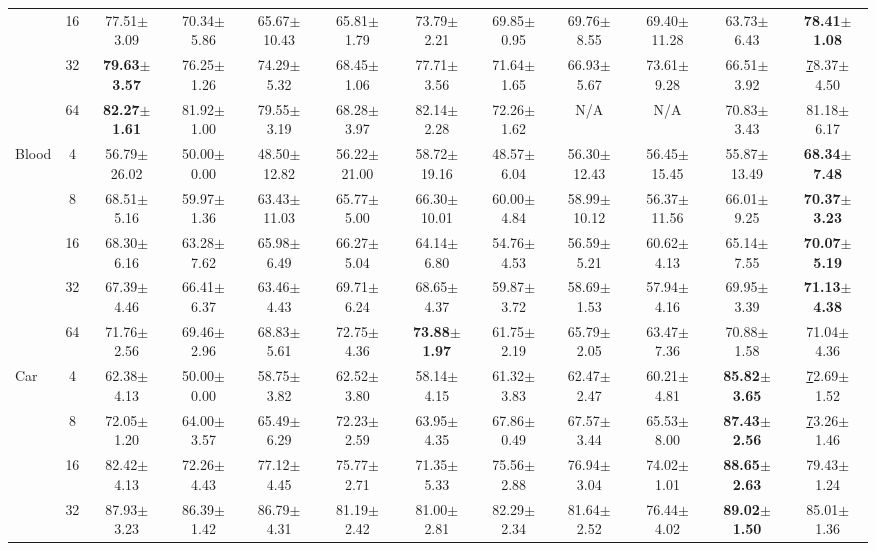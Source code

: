 \documentclass{article}
\theoremstyle{plain}
\theoremstyle{definition}
\theoremstyle{remark}
\begin{document}
\begin{table}[h!]
{\begin{tabular}{@{}lccccccccccc@{}}
 & 16 & 77.51$\pm$3.09 & 70.34$\pm$5.86 & 65.67$\pm$10.43 & 65.81$\pm$1.79 & 73.79$\pm$2.21 & 69.85$\pm$0.95 & 69.76$\pm$8.55 & 69.40$\pm$11.28 & 63.73$\pm$6.43 & \textbf{78.41$\pm$1.08} \\
 & 32 & \textbf{79.63$\pm$3.57} & 76.25$\pm$1.26 & 74.29$\pm$5.32 & 68.45$\pm$1.06 & 77.71$\pm$3.56 & 71.64$\pm$1.65 & 66.93$\pm$5.67 & 73.61$\pm$9.28 & 66.51$\pm$3.92 & {\ul 78.37$\pm$4.50} \\
 & 64 & \textbf{82.27$\pm$1.61} & 81.92$\pm$1.00 & 79.55$\pm$3.19 & 68.28$\pm$3.97 & 82.14$\pm$2.28 & 72.26$\pm$1.62 & N/A & N/A & 70.83$\pm$3.43 & 81.18$\pm$6.17 \\ \hline
Blood & 4 & 56.79$\pm$26.02 & 50.00$\pm$0.00 & 48.50$\pm$12.82 & 56.22$\pm$21.00 & 58.72$\pm$19.16 & 48.57$\pm$6.04 & 56.30$\pm$12.43 & 56.45$\pm$15.45 & 55.87$\pm$13.49 & \textbf{68.34$\pm$7.48} \\
 & 8 & 68.51$\pm$5.16 & 59.97$\pm$1.36 & 63.43$\pm$11.03 & 65.77$\pm$5.00 & 66.30$\pm$10.01 & 60.00$\pm$4.84 & 58.99$\pm$10.12 & 56.37$\pm$11.56 & 66.01$\pm$9.25 & \textbf{70.37$\pm$3.23} \\
 & 16 & 68.30$\pm$6.16 & 63.28$\pm$7.62 & 65.98$\pm$6.49 & 66.27$\pm$5.04 & 64.14$\pm$6.80 & 54.76$\pm$4.53 & 56.59$\pm$5.21 & 60.62$\pm$4.13 & 65.14$\pm$7.55 & \textbf{70.07$\pm$5.19} \\
 & 32 & 67.39$\pm$4.46 & 66.41$\pm$6.37 & 63.46$\pm$4.43 & 69.71$\pm$6.24 & 68.65$\pm$4.37 & 59.87$\pm$3.72 & 58.69$\pm$1.53 & 57.94$\pm$4.16 & 69.95$\pm$3.39 & \textbf{71.13$\pm$4.38} \\
 & 64 & 71.76$\pm$2.56 & 69.46$\pm$2.96 & 68.83$\pm$5.61 & 72.75$\pm$4.36 & \textbf{73.88$\pm$1.97} & 61.75$\pm$2.19 & 65.79$\pm$2.05 & 63.47$\pm$7.36 & 70.88$\pm$1.58 & 71.04$\pm$4.36 \\ \hline
Car & 4 & 62.38$\pm$4.13 & 50.00$\pm$0.00 & 58.75$\pm$3.82 & 62.52$\pm$3.80 & 58.14$\pm$4.15 & 61.32$\pm$3.83 & 62.47$\pm$2.47 & 60.21$\pm$4.81 & \textbf{85.82$\pm$3.65} & {\ul 72.69$\pm$1.52} \\
 & 8 & 72.05$\pm$1.20 & 64.00$\pm$3.57 & 65.49$\pm$6.29 & 72.23$\pm$2.59 & 63.95$\pm$4.35 & 67.86$\pm$0.49 & 67.57$\pm$3.44 & 65.53$\pm$8.00 & \textbf{87.43$\pm$2.56} & {\ul 73.26$\pm$1.46} \\
 & 16 & 82.42$\pm$4.13 & 72.26$\pm$4.43 & 77.12$\pm$4.45 & 75.77$\pm$2.71 & 71.35$\pm$5.33 & 75.56$\pm$2.88 & 76.94$\pm$3.04 & 74.02$\pm$1.01 & \textbf{88.65$\pm$2.63} & 79.43$\pm$1.24 \\
 & 32 & 87.93$\pm$3.23 & 86.39$\pm$1.42 & 86.79$\pm$4.31 & 81.19$\pm$2.42 & 81.00$\pm$2.81 & 82.29$\pm$2.34 & 81.64$\pm$2.52 & 76.44$\pm$4.02 & \textbf{89.02$\pm$1.50} & 85.01$\pm$1.36 \\

\end{tabular}}
\end{table}
\end{document}
